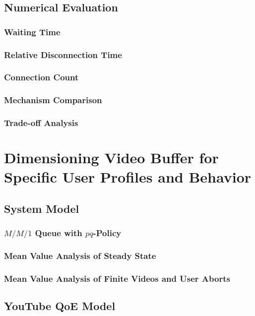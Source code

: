 \subsection{Numerical Evaluation}
\subsubsection*{Waiting Time}
\subsubsection*{Relative Disconnection Time}
\subsubsection*{Connection Count}
\subsubsection*{Mechanism Comparison}
\subsubsection*{Trade-off Analysis}

\section{Dimensioning Video Buffer for Specific User Profiles and Behavior}
\cite{Hossfeld2015}

\subsection{System Model}
\subsubsection*{\(M/M/1\) Queue with \(pq\)-Policy}
\subsubsection*{Mean Value Analysis of Steady State}
\subsubsection*{Mean Value Analysis of Finite Videos and User Aborts}

\subsection{YouTube QoE Model}
